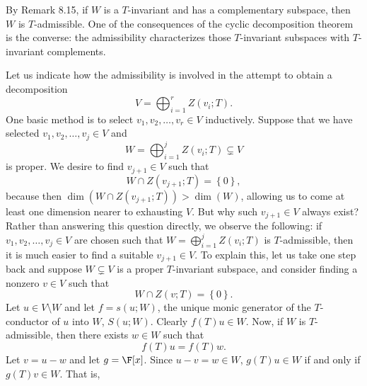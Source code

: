 \documentclass[linearalgebra]{subfiles}
\begin{document}
    \begin{remark}
        By Remark 8.15, if $W$ is a $T$-invariant and has a complementary subspace, then $W$ is $T$-admissible. One of the consequences of the cyclic decomposition theorem is the converse: the admissibility characterizes those $T$-invariant subspaces with $T$-invariant complements.
    \end{remark}

    \begin{remark}
        Let us indicate how the admissibility is involved in the attempt to obtain a decomposition
        \begin{equation*}
            V = \bigoplus^{r}_{i=1} Z(v_i;T).
        \end{equation*}
        One basic method is to select $v_1, v_2, \ldots, v_r\in V$ inductively. Suppose that we have selected $v_1, v_2, \ldots, v_j\in V$ and
        \begin{equation*}
            W = \bigoplus^{j}_{i=1} Z(v_i;T)\subsetneq V
        \end{equation*}
        is proper. We desire to find $v_{j+1}\in V$ such that
        \begin{equation*}
            W\cap Z(v_{j+1};T) = \left\lbrace 0 \right\rbrace ,
        \end{equation*}
        because then $\dim\left(W\cap Z(v_{j+1};T) \right) > \dim(W)$, allowing us to come at least one dimension nearer to exhausting $V$. But why such $v_{j+1}\in V$ always exist? Rather than answering this question directly, we observe the following: if $v_1, v_2,\ldots, v_j\in V$ are chosen such that $W=\bigoplus^{j}_{i=1} Z(v_i;T)$ is $T$-admissible, then it is much easier to find a suitable $v_{j+1}\in V$. To explain this, let us take one step back and suppose $W\subsetneq V$ is a proper $T$-invariant subspace, and consider finding a nonzero $v\in V$ such that
        \begin{equation*}
            W\cap Z(v;T) = \left\lbrace 0 \right\rbrace .
        \end{equation*}
        Let $u\in V\setminus W$ and let $f=s(u;W)$, the unique monic generator of the $T$-conductor of $u$ into $W$, $S(u;W)$. Clearly $f(T)u\in W$. Now, if $W$ is $T$-admissible, then there exists $w\in W$ such that
        \begin{equation*}
            f(T)u = f(T)w.
        \end{equation*}
        Let $v=u-w$ and let $g=\F[x]$. Since $u-v=w\in W$, $g(T)u\in W$ if and only if $g(T)v\in W$. That is,

\end{remark}
\end{document}
